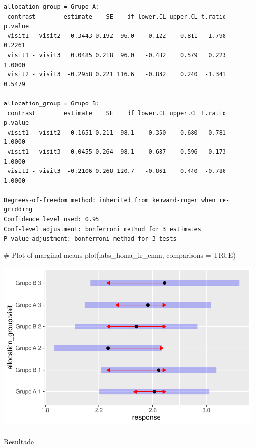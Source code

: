 \documentclass[
  12pt,
]{article}
\makeatletter
\let\oldparagraph\paragraph
\renewcommand{\paragraph}{
    \@ifstar
      \xxxParagraphStar
      \xxxParagraphNoStar
  }
\newcommand{\xxxParagraphStar}[1]{\oldparagraph*{#1}\mbox{}}
\newcommand{\xxxParagraphNoStar}[1]{\oldparagraph{#1}\mbox{}}
\newenvironment{Shaded}{\begin{snugshade}}{\end{snugshade}}
\newcommand{\AttributeTok}[1]{\textcolor[rgb]{0.40,0.45,0.13}{#1}}
\newcommand{\CommentTok}[1]{\textcolor[rgb]{0.37,0.37,0.37}{#1}}
\newcommand{\ConstantTok}[1]{\textcolor[rgb]{0.56,0.35,0.01}{#1}}
\newcommand{\FunctionTok}[1]{\textcolor[rgb]{0.28,0.35,0.67}{#1}}
\newcommand{\NormalTok}[1]{\textcolor[rgb]{0.00,0.23,0.31}{#1}}
\makeatother
\begin{document}
\begin{verbatim}
allocation_group = Grupo A:
 contrast        estimate    SE    df lower.CL upper.CL t.ratio p.value
 visit1 - visit2   0.3443 0.192  96.0   -0.122    0.811   1.798  0.2261
 visit1 - visit3   0.0485 0.218  96.0   -0.482    0.579   0.223  1.0000
 visit2 - visit3  -0.2958 0.221 116.6   -0.832    0.240  -1.341  0.5479

allocation_group = Grupo B:
 contrast        estimate    SE    df lower.CL upper.CL t.ratio p.value
 visit1 - visit2   0.1651 0.211  98.1   -0.350    0.680   0.781  1.0000
 visit1 - visit3  -0.0455 0.264  98.1   -0.687    0.596  -0.173  1.0000
 visit2 - visit3  -0.2106 0.268 120.7   -0.861    0.440  -0.786  1.0000

Degrees-of-freedom method: inherited from kenward-roger when re-gridding 
Confidence level used: 0.95 
Conf-level adjustment: bonferroni method for 3 estimates 
P value adjustment: bonferroni method for 3 tests 
\end{verbatim}

\begin{Shaded}
\begin{Highlighting}[]
\CommentTok{\# Plot of marginal means}
\FunctionTok{plot}\NormalTok{(labs\_homa\_ir\_emm, }\AttributeTok{comparisons =} \ConstantTok{TRUE}\NormalTok{)}
\end{Highlighting}
\end{Shaded}

\includegraphics{Outcomes_files/figure-pdf/labs_homa_ir_sens_emm-1.pdf}

\paragraph{Resultado}\label{resultado-11}
\end{document}
